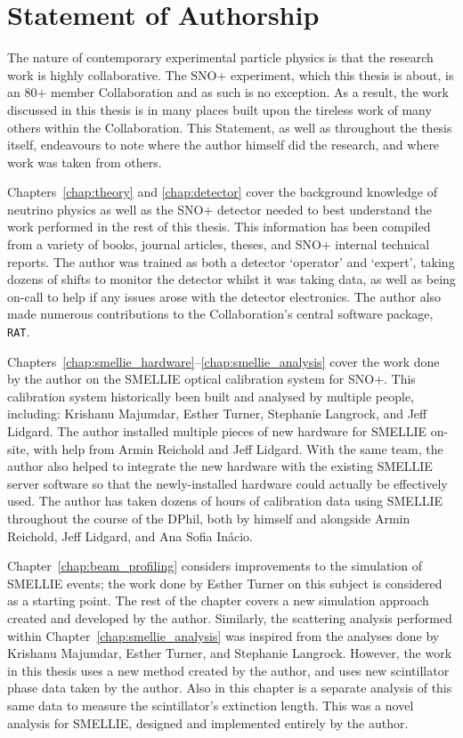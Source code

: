 \chapter*{Statement of Authorship}
The nature of contemporary experimental particle physics is that the research work is highly collaborative. The SNO+ experiment, which this thesis is about, is an 80+ member Collaboration and as such is no exception. As a result, the work discussed in this thesis is in many places built upon the tireless work of many others within the Collaboration. This Statement, as well as throughout the thesis itself, endeavours to note where the author himself did the research, and where work was taken from others.

Chapters~\ref{chap:theory} and \ref{chap:detector} cover the background knowledge of neutrino physics as well as the SNO+ detector needed to best understand the work performed in the rest of this thesis. This information has been compiled from a variety of books, journal articles, theses, and SNO+ internal technical reports. The author was trained as both a detector `operator' and `expert', taking dozens of shifts to monitor the detector whilst it was taking data, as well as being on-call to help if any issues arose with the detector electronics. The author also made numerous contributions to the Collaboration's central software package, \texttt{RAT}.

Chapters~\ref{chap:smellie_hardware}--\ref{chap:smellie_analysis} cover the work done by the author on the SMELLIE optical calibration system for SNO+. This calibration system historically been built and analysed by multiple people, including: Krishanu Majumdar, Esther Turner, Stephanie Langrock, and Jeff Lidgard. The author installed multiple pieces of new hardware for SMELLIE on-site, with help from Armin Reichold and Jeff Lidgard. With the same team, the author also helped to integrate the new hardware with the existing SMELLIE server software so that the newly-installed hardware could actually be effectively used. The author has taken dozens of hours of calibration data using SMELLIE throughout the course of the DPhil, both by himself and alongside Armin Reichold, Jeff Lidgard, and Ana Sofia In\'{a}cio.

Chapter~\ref{chap:beam_profiling} considers improvements to the simulation of SMELLIE events; the work done by Esther Turner on this subject is considered as a starting point. The rest of the chapter covers a new simulation approach created and developed by the author. Similarly, the scattering analysis performed within Chapter~\ref{chap:smellie_analysis} was inspired from the analyses done by Krishanu Majumdar, Esther Turner, and Stephanie Langrock. However, the work in this thesis uses a new method created by the author, and uses new scintillator phase data taken by the author. Also in this chapter is a separate analysis of this same data to measure the scintillator's extinction length. This was a novel analysis for SMELLIE, designed and implemented entirely by the author.

